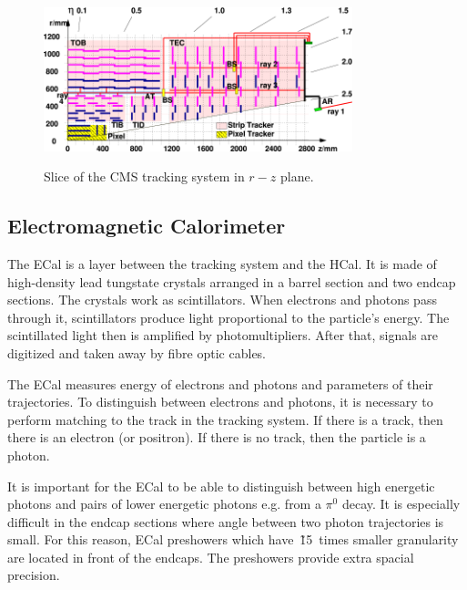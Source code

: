 \begin{figure}[htb]
  \begin{center}
    {\includegraphics[width=0.8\textwidth]{../figs/Exp/tracker_slice.png}}
    \caption{Slice of the CMS tracking system in $r-z$ plane.}
    \label{fig:tracker_slice}
  \end{center}
\end{figure}

\subsection{Electromagnetic Calorimeter}

The ECal is a layer between the tracking system and the HCal. It is made of high-density lead tungstate crystals arranged in a barrel section and two endcap sections. The crystals work as scintillators. When electrons and photons pass through it, scintillators produce light proportional to the particle's energy. The scintillated light then is amplified by photomultipliers. After that, signals are digitized and taken away by fibre optic cables.

The ECal measures energy of electrons and photons and parameters of their trajectories. To distinguish between electrons and photons, it is necessary to perform matching to the track in the tracking system. If there is a track, then there is an electron (or positron). If there is no track, then the particle is a photon.

It is important for the ECal to be able to distinguish between high energetic photons and pairs of lower energetic photons e.g. from a $\pi^0$ decay. It is especially difficult in the endcap sections where angle between two photon trajectories is small. For this reason, ECal preshowers which have~\~15~times smaller granularity are located in front of the endcaps. The preshowers provide extra spacial precision. 


